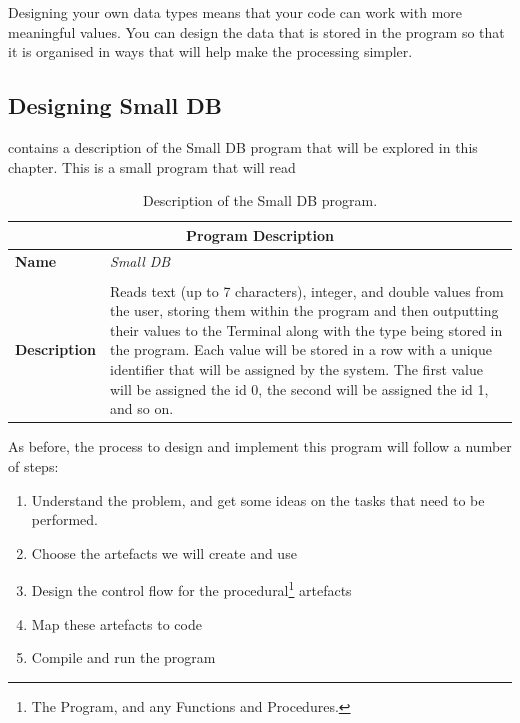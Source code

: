 Designing your own data types means that your code can work with more meaningful values. You can design the data that is stored in the program so that it is organised in ways that will help make the processing simpler.

\subsection{Designing Small DB} %
\label{sub:designing_small_db}

 contains a description of the Small DB program that will be explored in this chapter. This is a small program that will read

\begin{table}[h]
\centering
\begin{tabular}{l|p{10cm}}
  \hline
  \multicolumn{2}{c}{\textbf{Program Description}} \\
  \hline
  \textbf{Name} & \emph{Small DB} \\
  \\
  \textbf{Description} & Reads text (up to 7 characters), integer, and double values from the user, storing them within the program and then outputting their values to the Terminal along with the type being stored in the program. Each value will be stored in a row with a unique identifier that will be assigned by the system. The first value will be assigned the id 0, the second will be assigned the id 1, and so on.\\
  \hline
\end{tabular}
\caption{Description of the Small DB program.}
\label{tbl:small-db-prog}
\end{table}

As before, the process to design and implement this program will follow a number of steps:
\begin{enumerate}
  \item Understand the problem, and get some ideas on the tasks that need to be performed.
  \item Choose the artefacts we will create and use
  \item Design the control flow for the procedural\footnote{The Program, and any Functions and Procedures.} artefacts
  \item Map these artefacts to code
  \item Compile and run the program
\end{enumerate}


